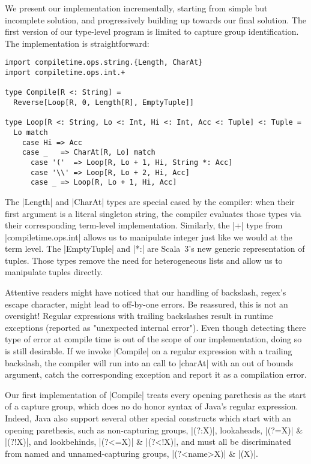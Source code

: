 We present our implementation incrementally, starting from simple but incomplete solution, and progressively building up towards our final solution.
The first version of our type-level program is limited to capture group identification.
The implementation is straightforward:

\begin{lstlisting}
import compiletime.ops.string.{Length, CharAt}
import compiletime.ops.int.+

type Compile[R <: String] =
  Reverse[Loop[R, 0, Length[R], EmptyTuple]]

type Loop[R <: String, Lo <: Int, Hi <: Int, Acc <: Tuple] <: Tuple =
  Lo match
    case Hi => Acc
    case _   => CharAt[R, Lo] match
      case '('  => Loop[R, Lo + 1, Hi, String *: Acc]
      case '\\' => Loop[R, Lo + 2, Hi, Acc]
      case _ => Loop[R, Lo + 1, Hi, Acc]
\end{lstlisting}

\noindent
The |Length| and |CharAt| types are special cased by the compiler: when their first argument is a literal singleton string, the compiler evaluates those types via their corresponding term-level implementation.
Similarly, the |+| type from |compiletime.ops.int| allows us to manipulate integer just like we would at the term level.
The |EmptyTuple| and |*:| are Scala~3's new generic representation of tuples.
Those types remove the need for heterogeneous lists and allow us to manipulate tuples directly.

Attentive readers might have noticed that our handling of backslash, regex's escape character, might lead to off-by-one errors.
Be reassured, this is not an oversight!
Regular expressions with trailing backslashes result in runtime exceptions (reported as "unexpected internal error").
Even though detecting there type of error at compile time is out of the scope of our implementation, doing so is still desirable.
If we invoke |Compile| on a regular expression with a trailing backslash, the compiler will run into an call to |charAt| with an out of bounds argument, catch the corresponding exception and report it as a compilation error.

Our first implementation of |Compile| treats every opening parethesis as the start of a capture group, which does no do honor syntax of Java's regular expression.
Indeed, Java also support several other special constructs which start with an opening parethesis, such as non-capturing groups, |(?:X)|, lookaheads, |(?=X)| \& |(?!X)|, and lookbehinds, |(?<=X)| \& |(?<!X)|, and must all be discriminated from named and unnamed-capturing groups, |(?<name>X)| \& |(X)|.

